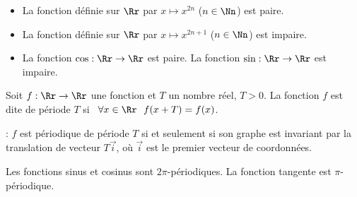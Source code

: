 \documentclass[class=report,crop=false]{standalone}
\begin{document}


\begin{exemple}
\sauteligne
\begin{itemize}
  \item La fonction définie sur $\Rr$ par $x\mapsto x^{2n}$ ($n\in\Nn$) est paire.

  \item La fonction définie sur $\Rr$ par $x\mapsto x^{2n+1}$ ($n\in\Nn$) est impaire.

  \item La fonction $\cos :\Rr\to\Rr$ est paire. La fonction $\sin :\Rr\to\Rr$ est impaire.
\end{itemize}
\end{exemple}



\begin{definition}
Soit $f:\Rr \to \Rr$ une fonction et $T$ un nombre réel, $T>0$.
La fonction $f$ est dite  de période $T$ si 
\ $\forall x\in\Rr \ \  f(x+T)=f(x)$.
\end{definition}



 : $f$ est périodique de période
$T$ si et seulement si son graphe est invariant par la translation
de vecteur $T \vec{i}$, où $\vec{i}$ est le premier vecteur de coordonnées.

\begin{exemple}
Les fonctions sinus et cosinus sont $2\pi$-périodiques. La fonction tangente est $\pi$-périodique.
\end{exemple}




\end{document}
